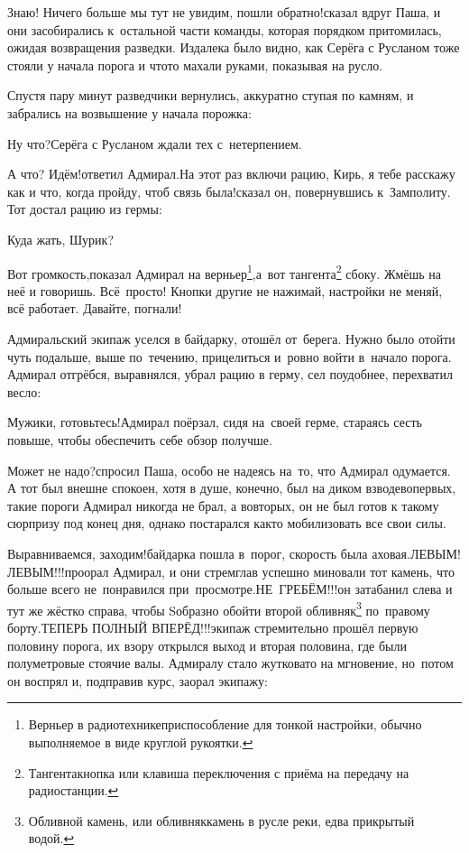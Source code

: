 \diagdash Знаю! Ничего больше мы тут не увидим, пошли обратно!\mdash сказал вдруг Паша, и они засобирались к~остальной части команды, которая порядком притомилась, ожидая возвращения разведки. Издалека было видно, как Серёга с Русланом тоже стояли у начала порога и что\sdash то махали руками, показывая на русло.

Спустя пару минут разведчики вернулись, аккуратно ступая по камням, и забрались на возвышение у начала порожка:

\diagdash Ну что?\mdash Серёга с Русланом ждали тех с~нетерпением.

\diagdash А что? Идём!\mdash ответил Адмирал.\mdash На этот раз включи рацию, Кирь, я тебе расскажу как и что, когда пройду, чтоб связь была!\mdash сказал он, повернувшись к~Замполиту. Тот достал рацию из гермы:

\diagdash Куда жать, Шурик?

\renewcommand*{\thefootnote}{\arabic{footnote}}
\setcounter{footnote}{0}
\diagdash Вот громкость,\mdash показал Адмирал на верньер\footnote{Верньер в радиотехнике\mdash приспособление для тонкой настройки, обычно выполняемое в виде круглой рукоятки.},\mdash а~вот тангента\footnote{Тангента\mdash кнопка или клавиша переключения с приёма на передачу на радиостанции.} сбоку. Жмёшь на неё и говоришь. Всё~просто! Кнопки другие не нажимай, настройки не меняй, всё работает. Давайте, погнали!

Адмиральский экипаж уселся в байдарку, отошёл от~берега. Нужно было отойти чуть подальше, выше по~течению, прицелиться и~ровно войти в~начало порога. Адмирал отгрёбся, выравнялся, убрал рацию в герму, сел поудобнее, перехватил весло: 

\diagdash Мужики, готовьтесь!\mdash Адмирал поёрзал, сидя на~своей герме, стараясь сесть повыше, чтобы обеспечить себе обзор получше.

\diagdash Может не надо?\mdash спросил Паша, особо не надеясь на~то, что Адмирал одумается. А тот был внешне спокоен, хотя в душе, конечно, был на диком взводе\mdash во\sdash первых, такие пороги Адмирал никогда не брал, а во\sdash вторых, он не был готов к такому сюрпризу под конец дня, однако постарался как\sdash то мобилизовать все свои силы.

\renewcommand*{\thefootnote}{\fnsymbol{footnote}}
\setcounter{footnote}{0}
\diagdash Выравниваемся, заходим!\mdash байдарка пошла в~порог, скорость была аховая.\mdash ЛЕВЫМ! ЛЕВЫМ!!!\mdash проорал Адмирал, и они стремглав успешно миновали тот камень, что больше всего не~понравился при~просмотре.\mdash НЕ~ГРЕБЁМ!!!\mdash он затабанил слева и тут же жёстко справа, чтобы S\sdash образно обойти второй обливняк\footnote{Обливной камень, или обливняк\mdash камень в русле реки, едва прикрытый водой.} по~правому борту.\mdash ТЕПЕРЬ ПОЛНЫЙ ВПЕРЁД!!!\mdash экипаж стремительно прошёл первую половину порога, их взору открылся выход и вторая половина, где были полуметровые стоячие валы. Адмиралу стало жутковато на мгновение, но~потом он воспрял и, подправив курс, заорал экипажу:

